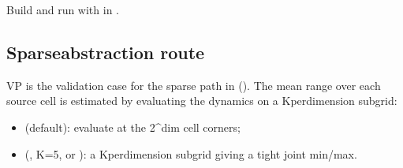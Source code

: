 \documentclass[a4paper,10pt,english]{sphinxmanual}
\begin{document}
\begin{sphinxVerbatim}[commandchars=\\\{\}]
\end{sphinxVerbatim}

\sphinxAtStartPar
Build and run with  in .


\subsection{Sparse\sphinxhyphen{}abstraction route}
\label{\detokenize{benchmarks/VP:sparse-abstraction-route}}
\sphinxAtStartPar
VP is the validation case for the sparse  path in
 (). The mean range over each source cell is
estimated by evaluating the dynamics on a K\sphinxhyphen{}per\sphinxhyphen{}dimension sub\sphinxhyphen{}grid:
\begin{itemize}
\item {} 
\sphinxAtStartPar
{} (default): evaluate at the 2\textasciicircum{}dim cell corners;

\item {} 
\sphinxAtStartPar
{} (, K=5, or ): a K\sphinxhyphen{}per\sphinxhyphen{}dimension sub\sphinxhyphen{}grid giving a tight
joint min/max.

\end{itemize}
\end{document}
